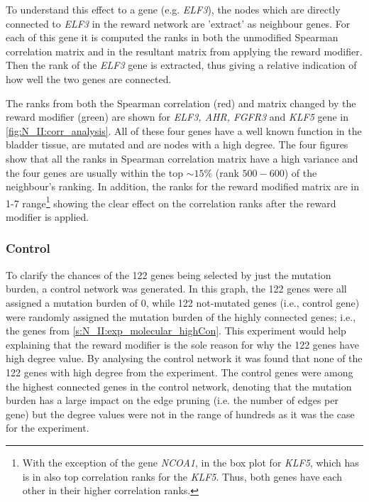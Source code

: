 To understand this effect to a gene (e.g. \textit{ELF3}), the nodes which are directly connected to \textit{ELF3} in the reward network are 'extract' as neighbour genes. For each of this gene it is computed the ranks in both the unmodified Spearman correlation matrix and in the resultant matrix from applying the reward modifier. Then the rank of the \textit{ELF3} gene is extracted, thus giving a relative indication of how well the two genes are connected.

The ranks from both the Spearman correlation (red) and matrix changed  by the reward modifier (green) are shown for \textit{ELF3, AHR, FGFR3} and \textit{KLF5} gene in \cref{fig:N_II:corr_analysis}. All of these four genes have a well known function in the bladder tissue, are mutated and are nodes with a high degree. The four figures show that all the ranks in Spearman correlation matrix have a high variance and the four genes are usually within the top $\sim15\%$ (rank $500-600$) of the neighbour's ranking. In addition, the ranks for the reward modified matrix are in 1-7 range\footnote{With the exception of the gene \textit{NCOA1}, in the box plot for \textit{KLF5}, which has is in also top correlation ranks for the \textit{KLF5}. Thus, both genes have each other in their higher correlation ranks.} showing the clear effect on the correlation ranks after the reward modifier is applied. 

\subsubsection*{Control}

To clarify the chances of the 122 genes being selected by just the mutation burden, a control network was generated. In this graph, the 122 genes were all assigned a mutation burden of 0, while 122 not-mutated genes (i.e., control gene) were randomly assigned the mutation burden of the highly connected genes; i.e., the genes from \cref{s:N_II:exp_molecular_highCon}. This experiment would help explaining that the reward modifier is the sole reason for why the 122 genes have high degree value. By analysing the control network it was found that none of the 122 genes with high degree from the experiment. The control genes were among the highest connected genes in the control network, denoting that the mutation burden has a large impact on the edge pruning (i.e. the number of edges per gene) but the degree values were not in the range of hundreds as it was the case for the experiment.

